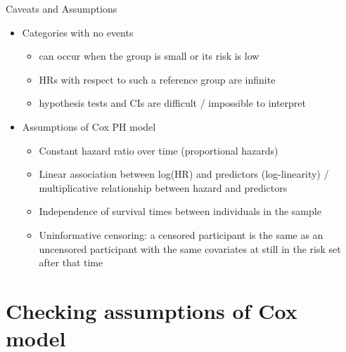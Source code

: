 \documentclass[
  ignorenonframetext,
]{beamer}
\providecommand{\tightlist}{%
  \setlength{\itemsep}{0pt}\setlength{\parskip}{0pt}}
\begin{document}
\begin{frame}{Caveats and Assumptions}
\protect\hypertarget{caveats-and-assumptions}{}

\begin{itemize}
\tightlist
\item
  Categories with no events

  \begin{itemize}
  \tightlist
  \item
    can occur when the group is small or its risk is low
  \item
    HRs with respect to such a reference group are infinite
  \item
    hypothesis tests and CIs are difficult / impossible to interpret
  \end{itemize}
\item
  Assumptions of Cox PH model

  \begin{itemize}
  \tightlist
  \item
    Constant hazard ratio over time (proportional hazards)
  \item
    Linear association between log(HR) and predictors (log-linearity) /
    multiplicative relationship between hazard and predictors
  \item
    Independence of survival times between individuals in the sample
  \item
    Uninformative censoring: a censored participant is the same as an
    uncensored participant with the same covariates at still in the risk
    set after that time
  \end{itemize}
\end{itemize}

\end{frame}

\hypertarget{checking-assumptions-of-cox-model}{%
\section{Checking assumptions of Cox
model}\label{checking-assumptions-of-cox-model}}
\end{document}
